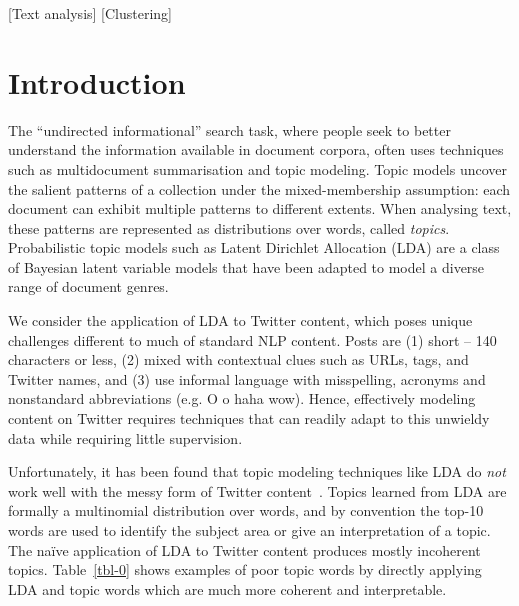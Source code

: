 \documentclass{sig-alternate}
\newcommand{\secmoveup}{\vspace{-1.mm}}
\begin{document}
\secmoveup
{}[Text analysis]
[Clustering]
\secmoveup
{}

\secmoveup
\section{Introduction}
\label{sec:intro}

The ``undirected informational'' search task, where people seek to
better understand the information available in document corpora, often uses
techniques such as multidocument summarisation and topic modeling.
Topic models uncover the salient patterns of a collection under the
mixed-membership assumption: each document can exhibit multiple
patterns to different extents.  When analysing text, these patterns
are represented as distributions over words, called \textit{topics}.
Probabilistic topic models such as Latent Dirichlet Allocation (LDA)
\cite{blei03} are a class of Bayesian latent variable models that have
been adapted to model a diverse range of document genres.

We consider the application of LDA to Twitter content, which poses
unique challenges different to much of standard NLP content. Posts
are (1) short -- 140 characters or less, (2) mixed with contextual clues
such as URLs, tags, and Twitter names, and (3) use informal language
with misspelling, acronyms and nonstandard abbreviations (e.g. O o
haha wow).  Hence, effectively modeling content on Twitter requires
techniques that can readily adapt to this unwieldy data while
requiring little supervision.

Unfortunately, it has been found that topic modeling techniques like
LDA do \emph{not} work well with the messy form of Twitter
content~\cite{wayne}.  Topics learned from LDA are formally a
multinomial distribution over words, and by convention the top-10
words are used to identify the subject area or give an interpretation
of a topic.  The na\"{i}ve application of LDA to Twitter content
produces mostly incoherent topics.  Table~\ref{tbl-0} shows examples of 
poor topic words by directly applying LDA and topic words which are much more
coherent and interpretable.
\end{document}

